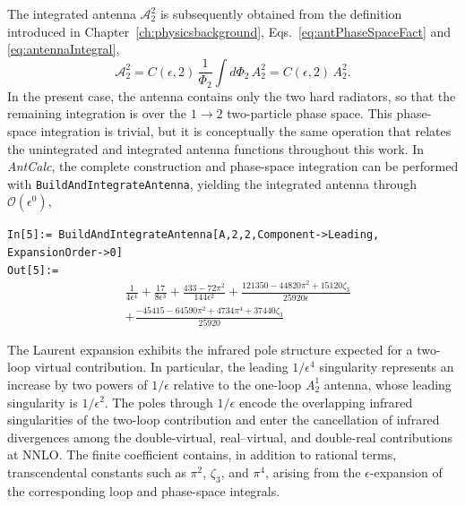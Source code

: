 The integrated antenna $\mathcal A_2^2$ is subsequently obtained from the definition introduced in
Chapter~\ref{ch:physicsbackground}, Eqs.~\eqref{eq:antPhaseSpaceFact} and \eqref{eq:antennaIntegral},
\begin{equation*}
    \mathcal A_2^2 = C(\epsilon,2)\,\frac{1}{\Phi_2}\int d\Phi_2\,A_2^2 = C(\epsilon,2)\,A_2^2.
\end{equation*}
In the present case, the antenna contains only the two hard radiators, so that the remaining
integration is over the $1\to2$ two-particle phase space. This phase-space integration is trivial, but
it is conceptually the same operation that relates the unintegrated and integrated antenna functions
throughout this work. In \textit{AntCalc}, the complete construction and phase-space integration can be
performed with \texttt{BuildAndIntegrateAntenna}, yielding the integrated antenna through
$\mathcal O(\epsilon^0)$,

\begin{mdframed}[backgroundcolor=gray!10, linewidth=0pt]
\texttt{In[5]:= BuildAndIntegrateAntenna[A,2,2,Component->Leading,\\ExpansionOrder->0]}\\
\hfill
\texttt{Out[5]:=}
    \begin{equation*}
        \begin{split}
            &\frac1{4\epsilon^4}+\frac{17}{8\epsilon^3}+\frac{433-72\pi^2}{144\epsilon^2}+\frac{121350-44820\pi^2+15120\zeta_3}{25920\epsilon}\\
            &+\frac{-45415-64590\pi^2+4734\pi^4+37440\zeta_3}{25920}
        \end{split}
    \end{equation*}
\end{mdframed}

The Laurent expansion exhibits the infrared pole structure expected for a two-loop virtual
contribution. In particular, the leading $1/\epsilon^4$ singularity represents an increase by two
powers of $1/\epsilon$ relative to the one-loop $A_2^1$ antenna, whose leading singularity is
$1/\epsilon^2$. The poles through $1/\epsilon$ encode the overlapping infrared singularities of the
two-loop contribution and enter the cancellation of infrared divergences among the double-virtual,
real--virtual, and double-real contributions at NNLO. The finite coefficient contains, in addition to
rational terms, transcendental constants such as $\pi^2$, $\zeta_3$, and $\pi^4$, arising from the
$\epsilon$-expansion of the corresponding loop and phase-space integrals.


